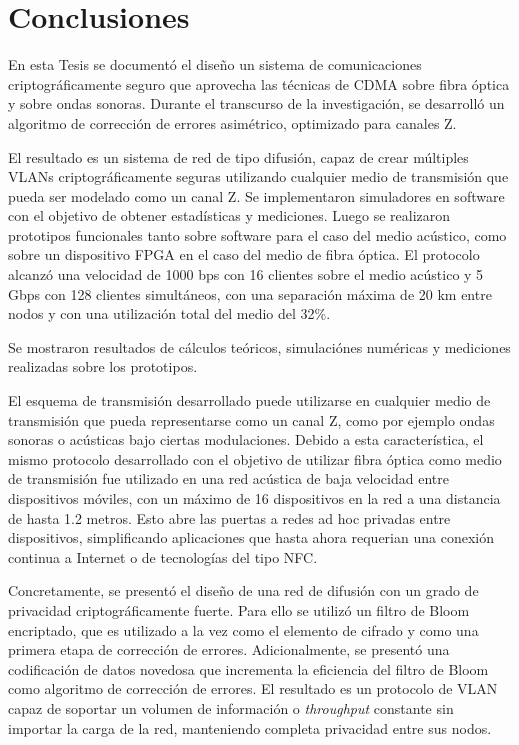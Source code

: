 \chapter{Conclusiones}

En esta Tesis se documentó el diseño un sistema de comunicaciones criptográficamente seguro que aprovecha las técnicas de CDMA sobre fibra óptica y sobre ondas sonoras. Durante el transcurso de la investigación, se desarrolló un algoritmo de corrección de errores asimétrico, optimizado para canales Z.

El resultado es un sistema de red de tipo difusión, capaz de crear múltiples VLANs criptográficamente seguras utilizando cualquier medio de transmisión que pueda ser modelado como un canal Z. 
Se implementaron simuladores en software con el objetivo de obtener estadísticas y mediciones. Luego se realizaron prototipos funcionales tanto sobre software para el caso del medio acústico, como sobre un dispositivo FPGA en el caso del medio de fibra óptica. El protocolo alcanzó una velocidad de 1000 bps con 16 clientes sobre el medio acústico y 5 Gbps con 128 clientes simultáneos, con una separación máxima de 20 km entre nodos y con una utilización total del medio del 32\%.

Se mostraron resultados de cálculos teóricos, simulaciónes numéricas y mediciones realizadas sobre los prototipos. 

El esquema de transmisión desarrollado puede utilizarse en cualquier medio de transmisión que pueda representarse como un canal Z, como por ejemplo ondas sonoras o acústicas bajo ciertas modulaciones. Debido a esta característica, el mismo protocolo desarrollado con el objetivo de utilizar fibra óptica como medio de transmisión fue utilizado en una red acústica de baja velocidad entre dispositivos móviles, con un máximo de 16 dispositivos en la red a una distancia de hasta 1.2 metros. Esto abre las puertas a redes ad hoc privadas entre dispositivos, simplificando aplicaciones que hasta ahora requerian una conexión continua a Internet o de tecnologías del tipo NFC.

Concretamente, se presentó el diseño de una red de difusión con un grado de privacidad criptográficamente fuerte. Para ello se utilizó un filtro de Bloom encriptado, que es utilizado a la vez como el elemento de cifrado y como una primera etapa de corrección de errores. Adicionalmente, se presentó una codificación de datos novedosa que incrementa la eficiencia del filtro de Bloom como algoritmo de corrección de errores. El resultado es un protocolo de VLAN capaz de soportar un volumen de información o \textit{throughput} constante sin importar la carga de la red, manteniendo completa privacidad entre sus nodos.

